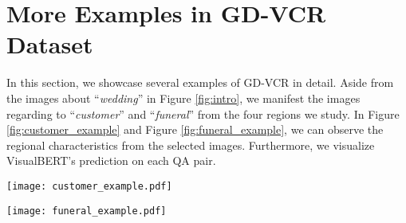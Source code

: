 \documentclass[11pt]{article}
\begin{document}
\section{More Examples in GD-VCR Dataset}
\label{appendix:examples}
In this section, we showcase several examples of GD-VCR in detail. Aside from the images about ``\textit{wedding}'' in Figure \ref{fig:intro}, we manifest the images regarding to ``\textit{customer}'' and ``\textit{funeral}'' from the four regions we study. In Figure \ref{fig:customer_example} and Figure \ref{fig:funeral_example}, we can observe the regional characteristics from the selected images. Furthermore, we visualize VisualBERT's prediction on each QA pair. 

\begin{figure*}[t]
    \centering
    \texttt{[image: customer\_example.pdf]}
    \caption{Examples of the images regarding ``\textit{customer}''. Left-to-right order: Western, South Asia, East Asia. We visualize the prediction of the VisualBERT model fine-tuned on the original VCR training set. The blue blocks denote the right answer choices. If red block appears, it means that VisualBERT wrongly predict the answer. The rightmost value indicates the probability of the corresponding choices being selected by VisualBERT.}
    \label{fig:customer_example}
\end{figure*}

\begin{figure*}[t]
    \centering
    \texttt{[image: funeral\_example.pdf]}
    \caption{Examples of the images regarding ``\textit{funeral}'' or ``\textit{death}''. Left-to-right order in the first row: Western, East Asia; Left-to-right order in the second row: South Asia, Africa.}
    \label{fig:funeral_example}
\end{figure*}
\end{document}
